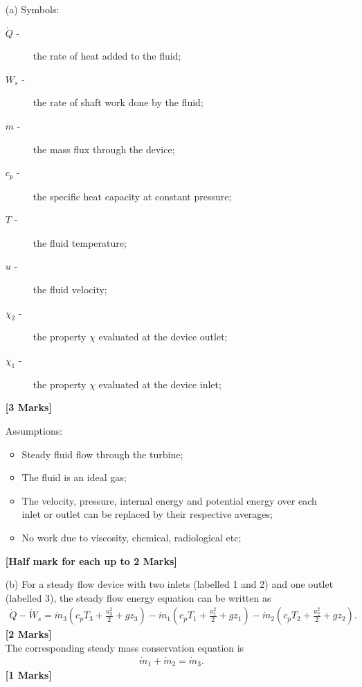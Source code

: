 \documentclass[12pt,twoside]{report}
\begin{document}
\begin{description}
\begin{itemize}
\item[(a)] Symbols:
\begin{description}
\item[$\dot{Q}$ -] the rate of heat added to the fluid;
\item[$\dot{W}_s$ -] the rate of shaft work done by the fluid;
\item[$\dot{m}$ -] the mass flux through the device;
\item[$c_p$ -] the specific heat capacity at constant pressure;
\item[$T$ -] the fluid temperature;
\item[$u$ -] the fluid velocity;
\item[$\chi_2$ -] the property $\chi$ evaluated at the device outlet;
\item[$\chi_1$ -] the property $\chi$ evaluated at the device inlet;
\end{description}
\hfill \textbf{[3 Marks]}

Assumptions:
\begin{itemize}
\item Steady fluid flow through the turbine;
\item The fluid is an ideal gas;
\item The velocity, pressure, internal energy and potential energy over each inlet or outlet can be replaced by their respective averages;
\item No work due to viscosity, chemical, radiological etc;
\end{itemize}
\hfill \textbf{[Half mark for each up to 2 Marks]}

\item[(b)] For a steady flow device with two inlets (labelled 1 and 2) and one outlet (labelled 3), the steady flow energy equation can be written as
\begin{align*}
 \dot{Q} - \dot{W}_s = \dot{m}_3 \left(c_p T_3 + \frac{u_3^2}{2} + g z_3\right) - \dot{m}_1 \left(c_p T_1 + \frac{u_1^2}{2} + g z_1\right) - \dot{m}_2 \left(c_p T_2 + \frac{u_2^2}{2} + g z_2\right).
\end{align*}\hfill \textbf{[2 Marks]} \\
The corresponding steady mass conservation equation is
\begin{align*}
 \dot{m}_1 + \dot{m}_2 = \dot{m}_3.
\end{align*}
\hfill \textbf{[1 Marks]}


\end{itemize}
\end{description}
\end{document}
